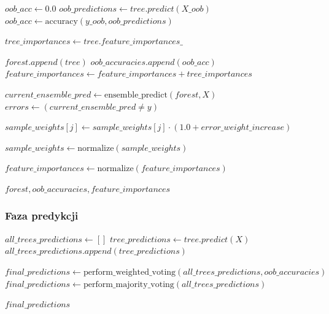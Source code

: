 \documentclass[11pt,a4paper]{article}
\begin{document}
\begin{algorithm}
\begin{algorithmic}[1]
    \State $oob\_acc \gets 0.0$
        \State $oob\_predictions \gets tree.predict(X\_oob)$
        \State $oob\_acc \gets \text{accuracy}(y\_oob, oob\_predictions)$
    \EndIf

    \State $tree\_importances \gets tree.feature\_importances\_$

    \State $forest.append(tree)$
    \State $oob\_accuracies.append(oob\_acc)$
    \State $feature\_importances \gets feature\_importances + tree\_importances$

        \State $current\_ensemble\_pred \gets \text{ensemble\_predict}(forest, X)$
        \State $errors \gets (current\_ensemble\_pred \neq y)$

                \State $sample\_weights[j] \gets sample\_weights[j] \cdot (1.0 + error\_weight\_increase)$
            \EndIf
        \EndFor

        \State $sample\_weights \gets \text{normalize}(sample\_weights)$
    \EndIf
\EndFor

    \State $feature\_importances \gets \text{normalize}(feature\_importances)$
\EndIf

\State \Return $forest, oob\_accuracies, feature\_importances$
\end{algorithmic}
\end{algorithm}

\subsubsection{Faza predykcji}

\begin{algorithm}
\caption{PredictModifiedRandomForest(forest, X, use\_weighted\_vote, oob\_accuracies)}
\begin{algorithmic}[1]
\State $all\_trees\_predictions \gets []$
    \State $tree\_predictions \gets tree.predict(X)$
    \State $all\_trees\_predictions.append(tree\_predictions)$
\EndFor

    \State $final\_predictions \gets \text{perform\_weighted\_voting}(all\_trees\_predictions, oob\_accuracies)$
\Else
    \State $final\_predictions \gets \text{perform\_majority\_voting}(all\_trees\_predictions)$
\EndIf

\State \Return $final\_predictions$
\end{algorithmic}
\end{algorithm}
\end{document}
